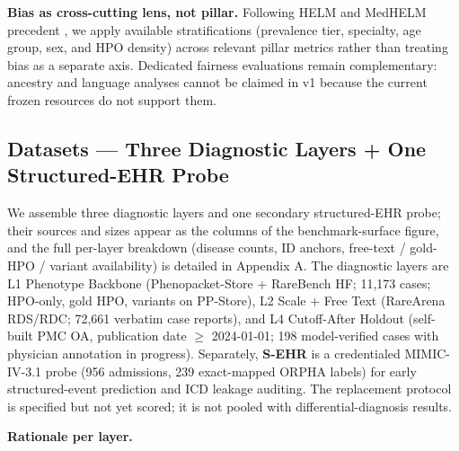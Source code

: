 \textbf{Bias as cross-cutting lens, not pillar.} Following HELM and MedHELM
precedent \citep{helm2022,medhelm2025}, we apply available stratifications
(prevalence tier, specialty, age group, sex, and HPO density) across relevant
pillar metrics rather than treating bias as a separate axis. Dedicated
fairness evaluations \citep{equitymedqa2024,heal2024,omiye2023,zack2024}
remain complementary: ancestry and language analyses cannot be claimed in v1
because the current frozen resources do not support them.

\subsection{Datasets --- Three Diagnostic Layers + One Structured-EHR Probe}\label{sec-4-2}

We assemble three diagnostic layers and one secondary structured-EHR probe; their
sources and sizes appear as the columns of the benchmark-surface figure, and
the full per-layer breakdown (disease counts, ID anchors, free-text / gold-HPO
/ variant availability) is detailed in Appendix A. The diagnostic layers are L1
Phenotype Backbone (Phenopacket-Store + RareBench HF; 11,173 cases; HPO-only,
gold HPO, variants on PP-Store), L2 Scale + Free Text (RareArena RDS/RDC;
72,661 verbatim case reports), and L4 Cutoff-After Holdout (self-built PMC
OA, publication date \ensuremath{\geq} 2024-01-01; 198 model-verified cases with physician
annotation in progress). Separately,
\textbf{S-EHR} is a credentialed MIMIC-IV-3.1 probe \citep{mimiciv31}
(956 admissions, 239 exact-mapped
ORPHA labels) for early structured-event prediction and ICD leakage auditing.
The replacement protocol is specified but not yet scored; it is not pooled
with differential-diagnosis results.

\textbf{Rationale per layer.}

